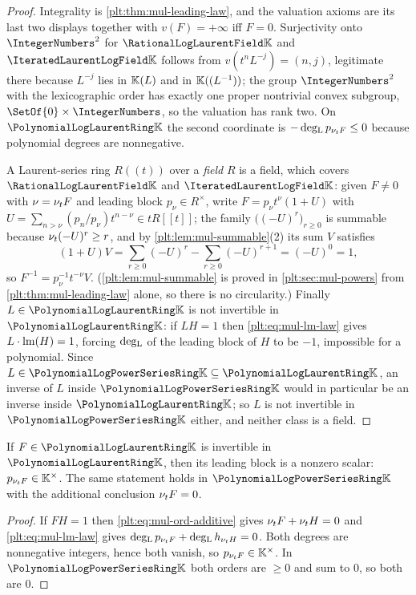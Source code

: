 \begin{proof}
Integrality is \cref{plt:thm:mul-leading-law}, and the valuation axioms are
its last two displays together with $v(F)=+\infty$ iff $F=0$.  Surjectivity
onto $\IntegerNumbers^2$ for $\PLrat$ and $\PLit$ follows from
$v(t^nL^{-j})=(n,j)$, legitimate there because $L^{-j}$ lies in $\mathbb{K}(L)$ and
in $\mathbb{K}((L^{-1}))$; the group $\IntegerNumbers^2$ with the lexicographic order
has exactly one proper nontrivial convex subgroup,
$\SetOf{0}\times\IntegerNumbers$, so the valuation has rank two.  On $\PLlau$
the second coordinate is $-\operatorname{deg_{L}} p_{\nu_{t} F}\le0$ because polynomial degrees
are nonnegative.

A Laurent-series ring $R((t))$ over a \emph{field} $R$ is a field, which
covers $\PLrat$ and $\PLit$: given $F\ne0$ with $\nu=\nu_{t} F$ and leading
block $p_\nu\in R^\times$, write $F=p_\nu t^{\nu}(1+U)$ with
$U=\sum_{n>\nu}(p_n/p_\nu)t^{n-\nu}\in tR[[t]]$; the family
$\bigl((-U)^r\bigr)_{r\ge0}$ is summable because $\nu_{t}(-U)^r\ge r$, and by
\cref{plt:lem:mul-summable}(2) its sum $V$ satisfies
\[
 (1+U)V=\sum_{r\ge0}(-U)^r-\sum_{r\ge0}(-U)^{r+1}=(-U)^0=1,
\]
so $F^{-1}=p_\nu^{-1}t^{-\nu}V$.  (\cref{plt:lem:mul-summable} is proved in
\cref{plt:sec:mul-powers} from \cref{plt:thm:mul-leading-law} alone, so there
is no circularity.)  Finally $L\in\PLlau$ is not invertible in
$\PLlau$: if $LH=1$ then \eqref{plt:eq:mul-lm-law} gives
$L\cdot\operatorname{lm}(H)=1$, forcing $\operatorname{deg_{L}}$ of the leading block of $H$ to be $-1$,
impossible for a polynomial.
Since $L\in\PLpow\subseteq\PLlau$, an inverse of $L$ inside $\PLpow$ would in
particular be an inverse inside $\PLlau$; so $L$ is not invertible in
$\PLpow$ either, and neither class is a field.
\end{proof}

\begin{corollary}
\label{plt:cor:mul-unit-necessary}
If $F\in\PLlau$ is invertible in $\PLlau$, then its leading block is a
nonzero scalar: $p_{\nu_{t} F}\in\mathbb{K}^\times$.  The same statement holds in
$\PLpow$ with the additional conclusion $\nu_{t} F=0$.
\end{corollary}

\begin{proof}
If $FH=1$ then \eqref{plt:eq:mul-ord-additive} gives
$\nu_{t} F+\nu_{t} H=0$ and \eqref{plt:eq:mul-lm-law} gives
$\operatorname{deg_{L}} p_{\nu_{t} F}+\operatorname{deg_{L}} h_{\nu_{t} H}=0$.  Both degrees are nonnegative
integers, hence both vanish, so $p_{\nu_{t} F}\in\mathbb{K}^\times$.  In $\PLpow$ both
orders are $\ge0$ and sum to $0$, so both are $0$.
\end{proof}


